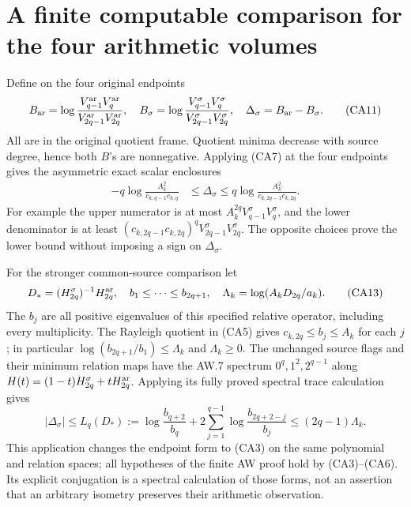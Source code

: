 \section{A finite computable comparison for the four arithmetic volumes}

Define on the four original endpoints
\[
 B_{\rm ar}=\log\frac{V_{q-1}^{\rm ar}V_q^{\rm ar}}
 {V_{2q-1}^{\rm ar}V_{2q}^{\rm ar}},\quad
 B_\sigma=\log\frac{V_{q-1}^\sigma V_q^\sigma}
 {V_{2q-1}^\sigma V_{2q}^\sigma},\quad
 \Delta_\sigma=B_{\rm ar}-B_\sigma.
 \tag{CA11}
\]
All are in the original quotient frame.  Quotient minima decrease with
source degree, hence both $B$'s are nonnegative.  Applying (CA7) at the
four endpoints gives the asymmetric exact scalar enclosures
\[
 \begin{split}
 -q\log\frac{A_k^2}{c_{k,q-1}c_{k,q}}
 &\le\Delta_\sigma\le
 q\log\frac{A_k^2}{c_{k,2q-1}c_{k,2q}}.
 \end{split}
 \tag{CA12}
\]
For example the upper numerator is at most
$A_k^{2q}V_{q-1}^\sigma V_q^\sigma$, and the lower denominator is at
least $(c_{k,2q-1}c_{k,2q})^qV_{2q-1}^\sigma V_{2q}^\sigma$.
The opposite choices prove the lower bound without imposing a sign on
$\Delta_\sigma$.

For the stronger common-source comparison let
\[
 D_*=(H_{2q}^\sigma)^{-1}H_{2q}^{\rm ar},\quad
 b_1\le\cdots\le b_{2q+1},\quad
 \Lambda_k=\log(A_kD_{2q}/a_k).
 \tag{CA13}
\]
The $b_j$ are all positive eigenvalues of this specified relative
operator, including every multiplicity.  The Rayleigh quotient in
(CA5) gives $c_{k,2q}\le b_j\le A_k$ for each $j$; in particular
$\log(b_{2q+1}/b_1)\le\Lambda_k$ and $\Lambda_k\ge0$.
The unchanged source flags and their minimum relation maps have the
AW.7 spectrum $0^q,1^2,2^{q-1}$ along
$H(t)=(1-t)H_{2q}^\sigma+tH_{2q}^{\rm ar}$.  Applying its fully
proved spectral trace calculation gives
\[
 \boxed{|\Delta_\sigma|\le L_q(D_*)
 :=\log\frac{b_{q+2}}{b_q}
 +2\sum_{j=1}^{q-1}\log\frac{b_{2q+2-j}}{b_j}
 \le(2q-1)\Lambda_k.}
 \tag{CA14}
\]
This application changes the endpoint form to (CA3) on the same
polynomial and relation spaces; all hypotheses of the finite AW proof
hold by (CA3)--(CA6).  Its explicit conjugation is a spectral calculation
of those forms, not an assertion that an arbitrary isometry preserves
their arithmetic observation.

